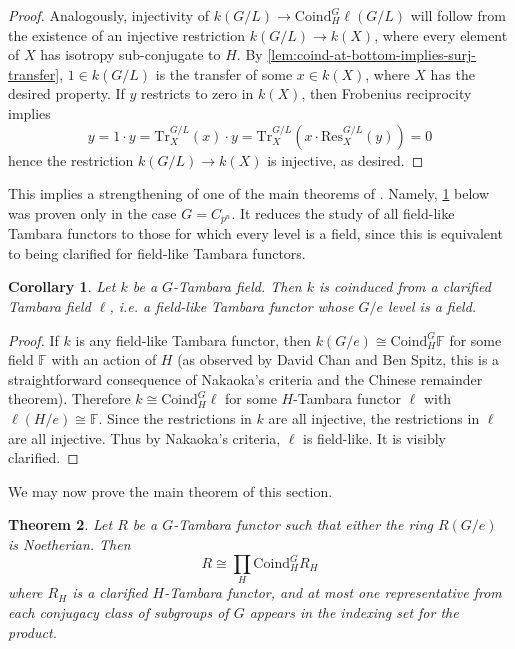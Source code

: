 \documentclass[11pt,dvipsnames]{amsart}
\newcommand{\F}{\mathbb{F}}
\newtheorem{theorem}{Theorem}[section]
\newtheorem{corollary}[theorem]{Corollary}
\theoremstyle{BoldRemark}
\begin{document}
\begin{proof}
	Analogously, injectivity of $k(G/L) \rightarrow \mathrm{Coind}_H^G \ell(G/L)$ will follow from the existence of an injective restriction $k(G/L) \rightarrow k(X)$, where every element of $X$ has isotropy sub-conjugate to $H$. By \cref{lem:coind-at-bottom-implies-surj-transfer}, $1 \in k(G/L)$ is the transfer of some $x \in k(X)$, where $X$ has the desired property. If $y$ restricts to zero in $k(X)$, then Frobenius reciprocity implies \[ y = 1 \cdot y = \mathrm{Tr}_X^{G/L}(x) \cdot y = \mathrm{Tr}_X^{G/L}(x \cdot \mathrm{Res}_X^{G/L}(y)) = 0 \] hence the restriction $k(G/L) \rightarrow k(X)$ is injective, as desired.
\end{proof}

This implies a strengthening of one of the main theorems of \cite{Wis24}. Namely, \cref{cor:field-likes-are-coinduced-from-clarified} below was proven only in the case $G = C_{p^n}$. It reduces the study of all field-like Tambara functors to those for which every level is a field, since this is equivalent to being clarified for field-like Tambara functors.

\begin{corollary}\label{cor:field-likes-are-coinduced-from-clarified}
	Let $k$ be a $G$-Tambara field. Then $k$ is coinduced from a clarified Tambara field $\ell$, i.e. a field-like Tambara functor whose $G/e$ level is a field.
\end{corollary}

\begin{proof}
	If $k$ is any field-like Tambara functor, then $k(G/e) \cong \mathrm{Coind}_H^G \F$ for some field $\F$ with an action of $H$ (as observed by David Chan and Ben Spitz, this is a straightforward consequence of Nakaoka's criteria \cite{Nak11a} and the Chinese remainder theorem). Therefore $k \cong \mathrm{Coind}_H^G \ell$ for some $H$-Tambara functor $\ell$ with $\ell(H/e) \cong \F$. Since the restrictions in $k$ are all injective, the restrictions in $\ell$ are all injective. Thus by Nakaoka's criteria, $\ell$ is field-like. It is visibly clarified.
\end{proof}

We may now prove the main theorem of this section.

\begin{theorem}\label{thm:product-decomposition}
	Let $R$ be a $G$-Tambara functor such that either the ring $R(G/e)$ is Noetherian. Then 
    \[ 
        R \cong \prod_H \mathrm{Coind}_H^G R_H 
    \] 
    where $R_H$ is a clarified $H$-Tambara functor, and at most one representative from each conjugacy class of subgroups of $G$ appears in the indexing set for the product.
\end{theorem}
\end{document}
